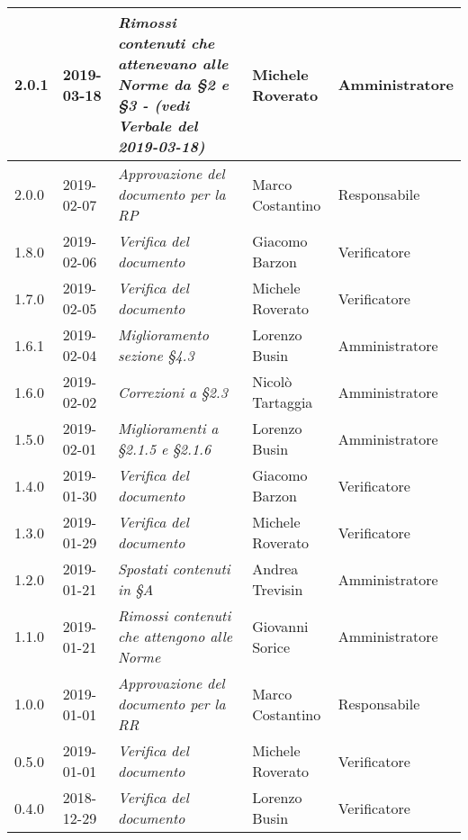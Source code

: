 \begin{longtable}{C{2cm}|C{2.5cm}|C{4.5cm}|C{2.5cm}|C{3cm}}
		2.0.1 & 2019-03-18 & \emph{Rimossi contenuti che attenevano alle Norme da §2 e §3 - (vedi Verbale del 2019-03-18)} & Michele Roverato & Amministratore \\
		\hline
	
		2.0.0 & 2019-02-07 & \emph{Approvazione del documento per la RP} & Marco Costantino & Responsabile \\
		\hline
	
		1.8.0 & 2019-02-06 & \emph{Verifica del documento} & Giacomo Barzon & Verificatore \\
		\hline
		
		1.7.0 & 2019-02-05 & \emph{Verifica del documento} & Michele Roverato & Verificatore \\
		\hline
	
		1.6.1 & 2019-02-04 & \emph{Miglioramento sezione §4.3} & Lorenzo Busin & Amministratore \\
		\hline
		
		1.6.0 & 2019-02-02 & \emph{Correzioni a §2.3} & Nicolò Tartaggia & Amministratore \\
		\hline
	
		1.5.0 & 2019-02-01 & \emph{Miglioramenti a  §2.1.5 e §2.1.6} & Lorenzo Busin & Amministratore \\
		\hline
	
		1.4.0 & 2019-01-30 & \emph{Verifica del documento} & Giacomo Barzon & Verificatore \\
		\hline
		
		1.3.0 & 2019-01-29 & \emph{Verifica del documento} & Michele Roverato & Verificatore \\
		\hline
		
		1.2.0 & 2019-01-21 & \emph{Spostati contenuti in §A} & Andrea Trevisin & Amministratore \\
		\hline
	
		1.1.0 & 2019-01-21 & \emph{Rimossi contenuti che attengono alle Norme} & Giovanni Sorice & Amministratore \\
		\hline
		
		1.0.0 & 2019-01-01 & \emph{Approvazione del documento per la RR} & Marco Costantino & Responsabile \\
		\hline
		
		0.5.0 & 2019-01-01 & \emph{Verifica del documento} & Michele Roverato & Verificatore \\
		\hline
		
		0.4.0 & 2018-12-29 & \emph{Verifica del documento} & Lorenzo Busin & Verificatore \\
		\hline
		

\end{longtable}
